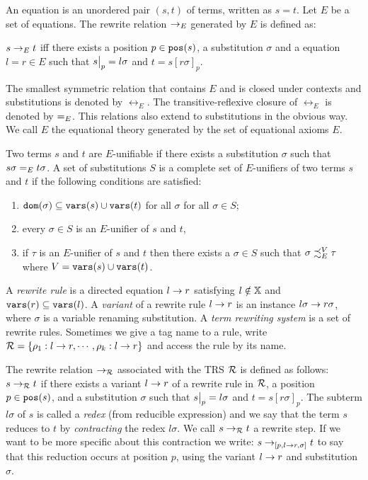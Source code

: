 An equation is an unordered pair $(s,t)$ of terms, written as $s = t$. Let $E$ be a set of equations. The rewrite relation $\rightarrow_E$ generated by $E$ is defined as:
\begin{center}
    $s \rightarrow_E t$ iff there exists a position $p \in \mathtt{pos}(s)$, a substitution $\sigma$ and a equation $l = r \in E$ such that \newline
    $\restr{s}{p} = l \sigma$ and $t = s[r\sigma]_p$.
\end{center}

The smallest symmetric relation that contains $E$ and is closed under contexts and substitutions is denoted by $\leftrightarrow_E$. The transitive-reflexive closure of $\leftrightarrow_E$ is denoted by $\eqUnif{E}$. This relations also extend to substitutions in the obvious way. We call $E$ the equational theory generated by the set of equational axioms $E$.

Two terms $s$ and $t$ are $E$-unifiable if there exists a substitution $\sigma$ such that $s\sigma \eqUnif{E} t\sigma$. A set of substitutions $S$ is a complete set of $E$-unifiers of two terms $s$ and $t$ if the following conditions are satisfied:
\begin{enumerate}
    \item $\mathtt{dom}(\sigma) \subseteq \mathtt{vars}(s) \cup \mathtt{vars}(t)$ for all $\sigma$ for all $\sigma \in S$;
    \item every $\sigma \in S$ is an $E$-unifier of $s$ and $t$,
    \item if $\tau$ is an $E$-unifier of $s$ and $t$ then there exists a $\sigma \in S$ such that $\sigma \iqoless[E][V] \tau$ where $V = \mathtt{vars}(s) \cup \mathtt{vars}(t)$.
\end{enumerate}

A \textit{rewrite rule} is a directed equation $l \rightarrow r$ satisfying $l \notin \mathbb{X}$ and $\mathtt{vars}(r) \subseteq \mathtt{vars}(l)$. A \textit{variant} of a rewrite rule $l \rightarrow r$ is an instance $l \sigma \rightarrow r \sigma$, where $\sigma$ is a variable renaming substitution. A \textit{term rewriting system} is a set of rewrite rules. Sometimes we give a tag name to a rule, write $\mathcal{R} = \{ \rho_1 : l \rightarrow r, \cdots, \rho_k : l \rightarrow r \}$ and access the rule by its name.

The rewrite relation $\rightarrow_{\mathcal{R}}$ associated with the TRS $\mathcal{R}$ is defined as follows: $s \rightarrow_{\mathcal{R}} t$ if there exists a variant $l \rightarrow r$ of a rewrite rule in $\mathcal{R}$, a position $p \in \mathtt{pos}(s)$, and a substitution $\sigma$ such that $\restr{s}{p} = l \sigma$ and $t = s[r \sigma]_p$. The subterm $l\sigma$ of $s$ is called a \textit{redex} (from reducible expression) and we say that the term $s$ reduces to $t$ by \textit{contracting} the redex $l \sigma$. We call $s \rightarrow_{\mathcal{R}} t$ a rewrite step. If we want to be more specific about this contraction we write: $s \rightarrow_{[p, l \rightarrow r, \sigma]}t$ to say that this reduction occurs at position $p$, using the variant $l \rightarrow r$ and substitution $\sigma$.


